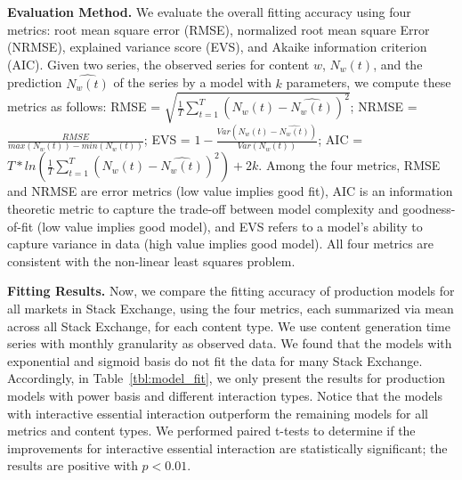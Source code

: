 \textbf{Evaluation Method.} We evaluate the overall fitting accuracy using four metrics: root mean square error (RMSE), normalized root mean square Error (NRMSE), explained variance score (EVS), and Akaike information criterion (AIC). Given two series, the observed series for content $w$, $N_w(t)$, and the prediction $\hat{N_w(t)}$ of the series by a model with $k$ parameters, we compute these metrics as follows: RMSE = $\sqrt{\frac{1}{T}\sum_{t=1}^{T}(N_w(t)-\hat{N_w(t)})^2}$; NRMSE = $\frac{RMSE}{max(N_w(t))-min(N_w(t))}$; EVS = $1-\frac{Var(N_w(t)-\hat{N_w(t)})}{Var(N_w(t))}$; AIC = $T*ln(\frac{1}{T}\sum_{t=1}^{T}(N_w(t)-\hat{N_w(t)})^2)+2k$. Among the four metrics, RMSE and NRMSE are error metrics (low value implies good fit), AIC is an information theoretic metric to capture the trade-off between model complexity and goodness-of-fit (low value implies good model), and EVS refers to a model's ability to capture variance in data (high value implies good model). All four metrics are consistent with the non-linear least squares problem. 

\textbf{Fitting Results.} Now, we compare the fitting accuracy of production models for all markets in Stack Exchange, using the four metrics, each summarized via mean across all Stack Exchange, for each content type. We use content generation time series with monthly granularity as observed data. We found that the models with exponential and sigmoid basis do not fit the data for many Stack Exchange. Accordingly, in Table~\ref{tbl:model_fit}, we only present the results for production models with power basis and different interaction types. Notice that the models with interactive essential interaction outperform the remaining models for all metrics and content types. We performed paired t-tests to determine if the improvements for interactive essential interaction are statistically significant; the results are positive with $p<0.01$.

